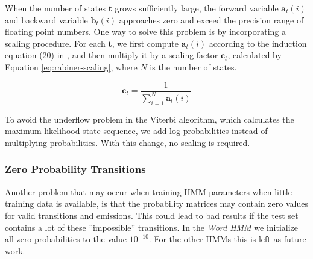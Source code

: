 When the number of states \textbf{t} grows sufficiently large, the forward variable $\textbf{a}_t(i)$ and backward variable  $\textbf{b}_t(i)$ approaches zero and exceed the precision range of floating point numbers.
One way to solve this problem is by incorporating a scaling procedure.
For each \textbf{t}, we first compute $\textbf{a}_t(i)$ according to the induction equation (20) in  \cite{Rabiner1989}, and then multiply it by a scaling factor  $\textbf{c}_t$, calculated by Equation \ref{eq:rabiner-scaling}, where $N$ is the number of states.

\begin{equation}\label{eq:rabiner-scaling}
\textbf{c}_t = \frac{1}{ \displaystyle\sum_{i=1}^N \textbf{a}_t(i)}
\end{equation}

To avoid the underflow problem in the Viterbi algorithm, which calculates the maximum likelihood state sequence, we add log probabilities instead of multiplying probabilities.
With this change, no scaling is required.

\subsubsection{Zero Probability Transitions}
Another problem that may occur when training HMM parameters when little training data is available, is that the probability matrices may contain zero values for valid transitions and emissions.
This could lead to bad results if the test set contains a lot of these ''impossible'' transitions.
In the \textit{Word HMM} we initialize all zero probabilities to the value \textbf{ $10^{-10}$}.
For the other HMMs this is left as future work.